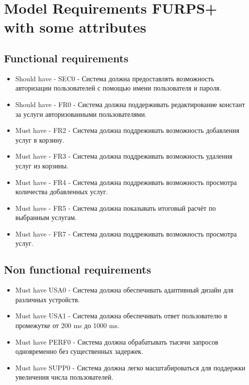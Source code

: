 \documentclass{article}
\begin{document}
\section{Model Requirements FURPS+ with some attributes}

\subsection{Functional requirements}
\begin{itemize}
    \item Should have - SEC0 - Система должна предоставлять возможность авторизации пользователей с помощью имени пользователя и пароля.
    \item Should have - FR0 - Система должна поддерживать редактирование констант за услуги авторизованными пользователями.
    \item Must have - FR2 - Система должна поддреживать возможность добавления услуг в корзину.
    \item Must have - FR3 - Система должна поддреживать возможность удаления услуг из корзины.
    \item Must have - FR4 - Система должна поддреживать возможность просмотра количества добавленных услуг.
    \item Must have - FR5 - Система должна показывать итоговый расчёт по выбранным услугам.
    \item Must have - FR7 - Система должна поддреживать возможность просмотра услуг.
\end{itemize}
\subsection{Non functional requirements}
\begin{itemize} 
    \item Must have USA0 - Система должна обеспечивать адаптивный дизайн для различных устройств.
    \item Must have USA1 - Система должна обеспечивать ответ пользователю в промежутке от 200 ms до 1000 ms.
    \item Must have PERF0 - Система должна обрабатывать тысячи запросов одновременно без существенных задержек.
    \item Must have SUPP0 - Система должна легко масштабироваться для поддержки увеличения числа пользователей.
\end{itemize}
\end{document}
